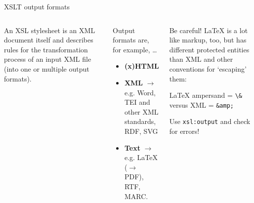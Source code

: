 \begin{frame}[fragile]{XSLT output formats}
\\

\small
\begin{columns}
\begin{block}{An XSL stylesheet} is an XML document itself and describes rules for the transformation process of an input XML file (into one or multiple output formats).
\end{block}
\begin{block}{Output formats are, for example, \dots}
\begin{itemize}\footnotesize
    \item \textbf{(x)HTML} \item \textbf{XML} $\to$ e.g. Word, TEI and other XML standards, RDF, SVG \item \textbf{Text} $\to$ e.g. LaTeX ($\to$ PDF), RTF, MARC.
\end{itemize}
\end{block}
\begin{block}{}
\alert{Be careful!} \LaTeX{} is a lot like markup, too, but has different protected entities than XML and other conventions for `escaping' them:

\LaTeX{} ampersand = \verb|\&| versus XML = \verb|&amp;|

Use \texttt{xsl:output} and check for errors!
\end{block}
\end{columns}


\end{frame}


